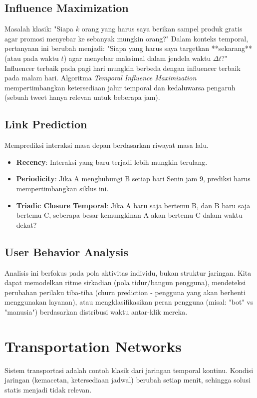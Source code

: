 \documentclass[12pt,a4paper]{book}
\begin{document}
\section{Influence Maximization}
Masalah klasik: "Siapa $k$ orang yang harus saya berikan sampel produk gratis agar promosi menyebar ke sebanyak mungkin orang?"
Dalam konteks temporal, pertanyaan ini berubah menjadi: "Siapa yang harus saya targetkan **sekarang** (atau pada waktu $t$) agar menyebar maksimal dalam jendela waktu $\Delta t$?"
Influencer terbaik pada pagi hari mungkin berbeda dengan influencer terbaik pada malam hari. Algoritma \textit{Temporal Influence Maximization} mempertimbangkan ketersediaan jalur temporal dan kedaluwarsa pengaruh (sebuah tweet hanya relevan untuk beberapa jam).

\section{Link Prediction}
Memprediksi interaksi masa depan berdasarkan riwayat masa lalu.
\begin{itemize}
    \item \textbf{Recency}: Interaksi yang baru terjadi lebih mungkin terulang.
    \item \textbf{Periodicity}: Jika A menghubungi B setiap hari Senin jam 9, prediksi harus mempertimbangkan siklus ini.
    \item \textbf{Triadic Closure Temporal}: Jika A baru saja bertemu B, dan B baru saja bertemu C, seberapa besar kemungkinan A akan bertemu C dalam waktu dekat?
\end{itemize}

\section{User Behavior Analysis}
Analisis ini berfokus pada pola aktivitas individu, bukan struktur jaringan.
Kita dapat memodelkan ritme sirkadian (pola tidur/bangun pengguna), mendeteksi perubahan perilaku tiba-tiba (churn prediction - pengguna yang akan berhenti menggunakan layanan), atau mengklasifikasikan peran pengguna (misal: "bot" vs "manusia") berdasarkan distribusi waktu antar-klik mereka.

\chapter{Transportation Networks}
Sistem transportasi adalah contoh klasik dari jaringan temporal kontinu. Kondisi jaringan (kemacetan, ketersediaan jadwal) berubah setiap menit, sehingga solusi statis menjadi tidak relevan.
\end{document}
